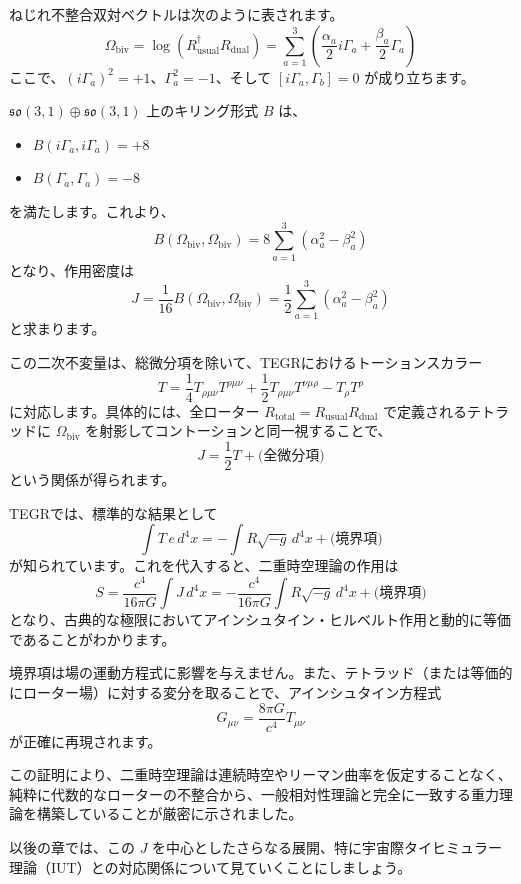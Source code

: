 \documentclass[a4paper,12pt,notitlepage]{jsreport}
\begin{document}
ねじれ不整合双対ベクトルは次のように表されます。
\begin{equation}
  \Omega_{\text{biv}} = \log(R_\text{usual}^\dagger R_\text{dual}) = \sum_{a=1}^3 \left( \frac{\alpha_a}{2} i \Gamma_a + \frac{\beta_a}{2} \Gamma_a \right)
\end{equation}
ここで、$(i\Gamma_a)^2 = +1$、$\Gamma_a^2 = -1$、そして $[i\Gamma_a, \Gamma_b] = 0$ が成り立ちます。

$\mathfrak{so}(3,1) \oplus \mathfrak{so}(3,1)$ 上のキリング形式 $B$ は、
\begin{itemize}
  \item $B(i\Gamma_a, i\Gamma_a) = +8$
  \item $B(\Gamma_a, \Gamma_a) = -8$
\end{itemize}
を満たします。これより、
\begin{equation}
  B(\Omega_{\text{biv}}, \Omega_{\text{biv}}) = 8 \sum_{a=1}^3 (\alpha_a^2 - \beta_a^2)
\end{equation}
となり、作用密度は
\begin{equation}
  J = \frac{1}{16} B(\Omega_{\text{biv}}, \Omega_{\text{biv}}) = \frac{1}{2} \sum_{a=1}^3 (\alpha_a^2 - \beta_a^2)
\end{equation}
と求まります。

この二次不変量は、総微分項を除いて、TEGRにおけるトーションスカラー
\begin{equation}
  T = \frac{1}{4} T_{\rho\mu\nu}T^{\rho\mu\nu} + \frac{1}{2} T_{\rho\mu\nu}T^{\nu\mu\rho} - T_\rho T^\rho
\end{equation}
に対応します。具体的には、全ローター $R_{\text{total}} = R_\text{usual} R_\text{dual}$ で定義されるテトラッドに $\Omega_{\text{biv}}$ を射影してコントーションと同一視することで、
\begin{equation}
  J = \frac{1}{2} T + \text{(全微分項)}
\end{equation}
という関係が得られます。

TEGRでは、標準的な結果として
\begin{equation}
  \int T \, e \, d^4 x = -\int R \sqrt{-g} \, d^4 x + \text{(境界項)}
\end{equation}
が知られています。これを代入すると、二重時空理論の作用は
\begin{equation}
  S = \frac{c^4}{16\pi G} \int J \, d^4 x = -\frac{c^4}{16\pi G} \int R \sqrt{-g} \, d^4 x + \text{(境界項)}
\end{equation}
となり、古典的な極限においてアインシュタイン・ヒルベルト作用と動的に等価であることがわかります。

境界項は場の運動方程式に影響を与えません。また、テトラッド（または等価的にローター場）に対する変分を取ることで、アインシュタイン方程式
\begin{equation}
  G_{\mu\nu} = \frac{8\pi G}{c^4} T_{\mu\nu}
\end{equation}
が正確に再現されます。

この証明により、二重時空理論は連続時空やリーマン曲率を仮定することなく、純粋に代数的なローターの不整合から、一般相対性理論と完全に一致する重力理論を構築していることが厳密に示されました。

以後の章では、この $J$ を中心としたさらなる展開、特に宇宙際タイヒミュラー理論（IUT）との対応関係について見ていくことにしましょう。
\end{document}
